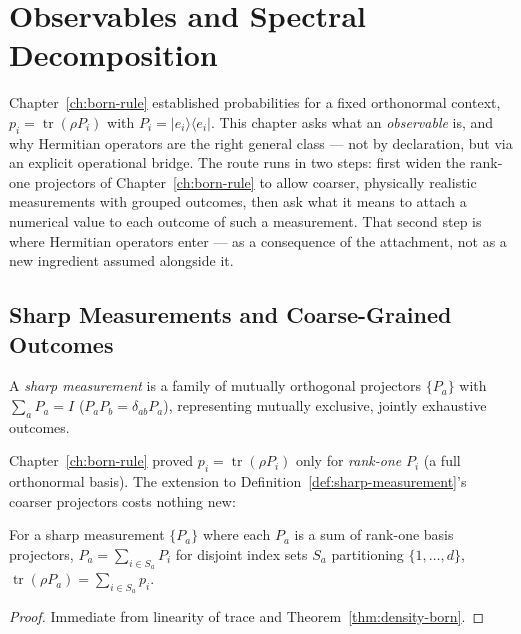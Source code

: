 \chapter{Observables and Spectral Decomposition}
\label{ch:observables}

Chapter~\ref{ch:born-rule} established probabilities for a fixed orthonormal
context, $p_i=\operatorname{tr}(\rho P_i)$ with $P_i=|e_i\rangle\langle e_i|$.
This chapter asks what an \emph{observable} is, and why Hermitian operators
are the right general class — not by declaration, but via an explicit
operational bridge. The route runs in two steps: first widen the rank-one
projectors of Chapter~\ref{ch:born-rule} to allow coarser, physically
realistic measurements with grouped outcomes, then ask what it means to
attach a numerical value to each outcome of such a measurement. That second
step is where Hermitian operators enter — as a consequence of the
attachment, not as a new ingredient assumed alongside it.

\section{Sharp Measurements and Coarse-Grained Outcomes}

\begin{definition}
\label{def:sharp-measurement}
A \emph{sharp measurement} is a family of mutually orthogonal projectors
$\{P_a\}$ with $\sum_a P_a = I$ ($P_aP_b=\delta_{ab}P_a$), representing
mutually exclusive, jointly exhaustive outcomes.
\end{definition}

Chapter~\ref{ch:born-rule} proved $p_i=\operatorname{tr}(\rho P_i)$ only for
\emph{rank-one} $P_i$ (a full orthonormal basis). The extension to
Definition~\ref{def:sharp-measurement}'s coarser projectors costs nothing new:

\begin{proposition}
\label{prop:coarse-born}
For a sharp measurement $\{P_a\}$ where each $P_a$ is a sum of rank-one basis
projectors, $P_a = \sum_{i\in S_a} P_i$ for disjoint index sets $S_a$
partitioning $\{1,\dots,d\}$, $\operatorname{tr}(\rho P_a) = \sum_{i\in S_a}
p_i$.
\end{proposition}

\begin{proof}
Immediate from linearity of trace and Theorem~\ref{thm:density-born}.
\end{proof}

